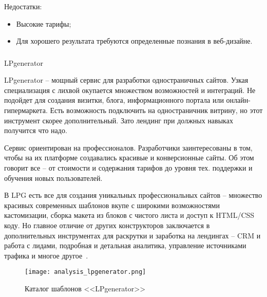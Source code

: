 Недостатки:

\begin{itemize}
	\item Высокие тарифы;
	\item Для хорошего результата требуются определенные познания в веб-дизайне.
\end{itemize}

\subsubsection{}LPgenerator
\

LPgenerator -- мощный сервис для разработки одностраничных сайтов. Узкая специализация с лихвой окупается множеством возможностей и интеграций. Не подойдет для создания визитки, блога, информационного портала или онлайн-гипермаркета. Есть возможность подключить на одностраничник витрину, но этот инструмент скорее дополнительный. Зато лендинг при должных навыках получится что надо.

Сервис ориентирован на профессионалов. Разработчики заинтересованы в том, чтобы на их платформе создавались красивые и конверсионные сайты. Об этом говорит все -- от стоимости и содержания тарифов до уровня тех. поддержки и обучения новых пользователей. 

В LPG есть все для создания уникальных профессиональных сайтов -- множество красивых современных шаблонов вкупе с широкими возможностями кастомизации, сборка макета из блоков с чистого листа и доступ к HTML/CSS коду. Но главное отличие от других конструкторов заключается в дополнительных инструментах для раскрутки и заработка на лендингах -- CRM и работа с лидами, подробная и детальная аналитика, управление источниками трафика и многое другое~\cite{cms_examples}.

\begin{figure}
\centering
	\texttt{[image: analysis\_lpgenerator.png]}
	\caption{Каталог шаблонов <<LPgenerator>>}
	\label{sec:analysis:lpgenerator}
\end{figure}